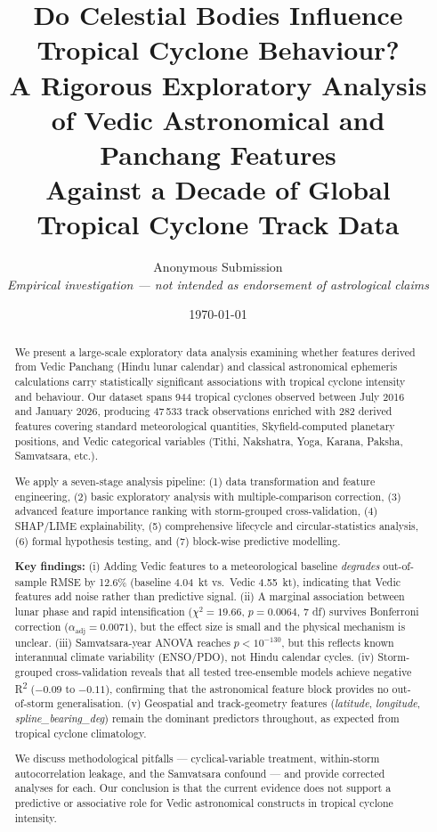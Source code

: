 \documentclass[12pt,a4paper]{article}
\title{
  {\Large \textbf{Do Celestial Bodies Influence Tropical Cyclone Behaviour?}}\\[0.4em]
  {\large A Rigorous Exploratory Analysis of Vedic Astronomical and Panchang Features\\
  Against a Decade of Global Tropical Cyclone Track Data}
}
\author{
  Anonymous Submission\\[0.3em]
  \small \textit{Empirical investigation --- not intended as endorsement of astrological claims}
}
\date{\today}
\begin{document}
\maketitle
\thispagestyle{fancy}

\begin{abstract}
\noindent
We present a large-scale exploratory data analysis examining whether features derived
from Vedic Panchang (Hindu lunar calendar) and classical astronomical ephemeris
calculations carry statistically significant associations with tropical cyclone
intensity and behaviour.
Our dataset spans 944 tropical cyclones observed between July 2016 and January 2026,
producing 47\,533 track observations enriched with 282 derived features covering
standard meteorological quantities, Skyfield-computed planetary positions, and
Vedic categorical variables (Tithi, Nakshatra, Yoga, Karana, Paksha, Samvatsara, etc.).

We apply a seven-stage analysis pipeline: (1) data transformation and feature
engineering, (2) basic exploratory analysis with multiple-comparison correction,
(3) advanced feature importance ranking with storm-grouped cross-validation,
(4) SHAP/LIME explainability, (5) comprehensive lifecycle and circular-statistics
analysis, (6) formal hypothesis testing, and (7) block-wise predictive modelling.

\textbf{Key findings:}
(i) Adding Vedic features to a meteorological baseline \emph{degrades} out-of-sample
    RMSE by 12.6\% (baseline 4.04~kt vs.\ Vedic 4.55~kt), indicating that Vedic
    features add noise rather than predictive signal.
(ii) A marginal association between lunar phase and rapid intensification
    ($\chi^2 = 19.66$, $p = 0.0064$, 7 df) survives Bonferroni correction
    ($\alpha_{\text{adj}} = 0.0071$), but the effect size is small and the physical
    mechanism is unclear.
(iii) Samvatsara-year ANOVA reaches $p < 10^{-130}$, but this reflects known
    interannual climate variability (ENSO/PDO), not Hindu calendar cycles.
(iv) Storm-grouped cross-validation reveals that all tested tree-ensemble models
    achieve negative R\textsuperscript{2} ($-0.09$ to $-0.11$), confirming that the
    astronomical feature block provides no out-of-storm generalisation.
(v) Geospatial and track-geometry features (\textit{latitude}, \textit{longitude},
    \textit{spline\_bearing\_deg}) remain the dominant predictors throughout, as
    expected from tropical cyclone climatology.

We discuss methodological pitfalls --- cyclical-variable treatment, within-storm
autocorrelation leakage, and the Samvatsara confound --- and provide corrected
analyses for each. Our conclusion is that the current evidence does not support
a predictive or associative role for Vedic astronomical constructs in tropical
cyclone intensity.
\end{abstract}
\end{document}
